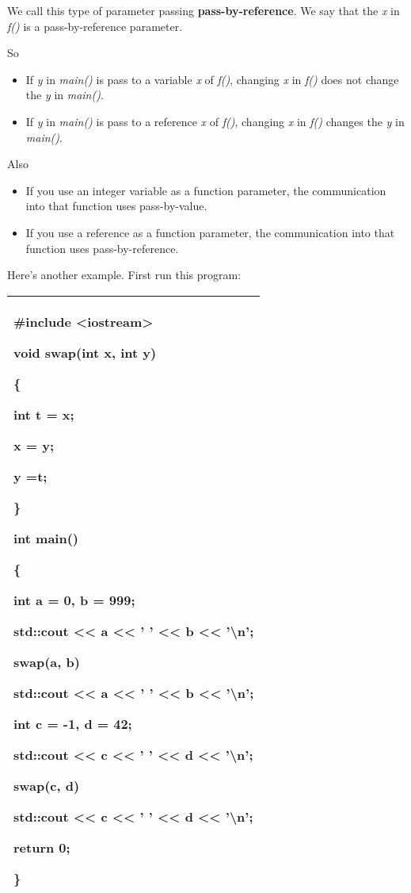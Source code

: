 \documentclass[
]{article}
\providecommand{\tightlist}{%
  \setlength{\itemsep}{0pt}\setlength{\parskip}{0pt}}
\begin{document}
We call this type of parameter passing \textbf{pass-by-reference}. We
say that the \emph{x} in \emph{f()} is a pass-by-reference parameter.

So

\begin{itemize}
\tightlist
\item
  If \emph{y} in \emph{main()} is pass to a variable \emph{x} of
  \emph{f()}, changing \emph{x} in \emph{f()} does not change the
  \emph{y} in \emph{main()}.
\item
  If \emph{y} in \emph{main()} is pass to a reference \emph{x} of
  \emph{f()}, changing \emph{x} in \emph{f()} changes the \emph{y} in
  \emph{main()}.
\end{itemize}

Also

\begin{itemize}
\tightlist
\item
  If you use an integer variable as a function parameter, the
  communication into that function uses pass-by-value.
\item
  If you use a reference as a function parameter, the communication into
  that function uses pass-by-reference.
\end{itemize}

Here's another example. First run this program:

\begin{longtable}[]{@{}l@{}}
\toprule
\endhead
\begin{minipage}[t]{0.97\columnwidth}\raggedright
\#include \textless iostream\textgreater{}

void swap(int x, int y)

\{

int t = x;

x = y;

y =t;

\}

int main()

\{

int a = 0, b = 999;

std::cout \textless\textless{} a \textless\textless{} ' '
\textless\textless{} b \textless\textless{} '\textbackslash n';

swap(a, b)

std::cout \textless\textless{} a \textless\textless{} ' '
\textless\textless{} b \textless\textless{} '\textbackslash n';

int c = -1, d = 42;

std::cout \textless\textless{} c \textless\textless{} ' '
\textless\textless{} d \textless\textless{} '\textbackslash n';

swap(c, d)

std::cout \textless\textless{} c \textless\textless{} ' '
\textless\textless{} d \textless\textless{} '\textbackslash n';

return 0;

\}\strut
\end{minipage}\tabularnewline
\bottomrule
\end{longtable}
\end{document}
